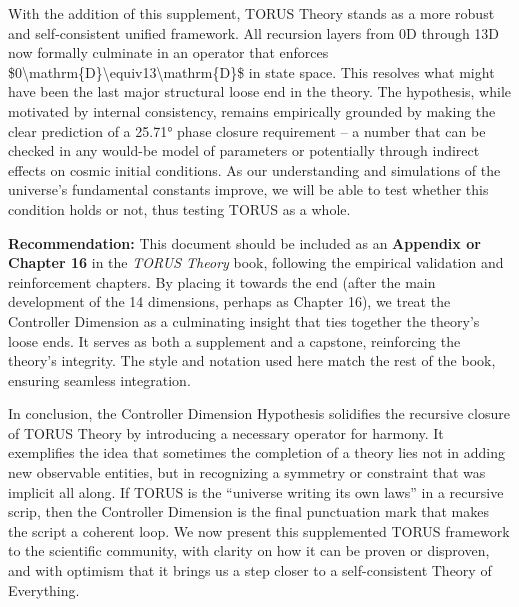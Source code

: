 \documentclass[
]{article}
\begin{document}
With the addition of this supplement, TORUS Theory stands as a more
robust and self-consistent unified framework. All recursion layers from
0D through 13D now formally culminate in an operator that enforces
\$0\textbackslash mathrm\{D\}\textbackslash equiv13\textbackslash mathrm\{D\}\$
in state space. This resolves what might have been the last major
structural loose end in the theory. The hypothesis, while motivated by
internal consistency, remains empirically grounded by making the clear
prediction of a 25.71° phase closure requirement -- a number that can be
checked in any would-be model of parameters or potentially through
indirect effects on cosmic initial conditions. As our understanding and
simulations of the universe's fundamental constants improve, we will be
able to test whether this condition holds or not, thus testing TORUS as
a whole.

\textbf{Recommendation:} This document should be included as an
\textbf{Appendix or Chapter 16} in the \emph{TORUS Theory} book,
following the empirical validation and reinforcement chapters. By
placing it towards the end (after the main development of the 14
dimensions, perhaps as Chapter 16), we treat the Controller Dimension as
a culminating insight that ties together the theory's loose ends. It
serves as both a supplement and a capstone, reinforcing the theory's
integrity. The style and notation used here match the rest of the book,
ensuring seamless integration.

In conclusion, the Controller Dimension Hypothesis solidifies the
recursive closure of TORUS Theory by introducing a necessary operator
for harmony. It exemplifies the idea that sometimes the completion of a
theory lies not in adding new observable entities, but in recognizing a
symmetry or constraint that was implicit all along. If TORUS is the
``universe writing its own laws'' in a recursive scrip\hspace{0pt}, then
the Controller Dimension is the final punctuation mark that makes the
script a coherent loop. We now present this supplemented TORUS framework
to the scientific community, with clarity on how it can be proven or
disproven, and with optimism that it brings us a step closer to a
self-consistent Theory of Everything.
\end{document}
